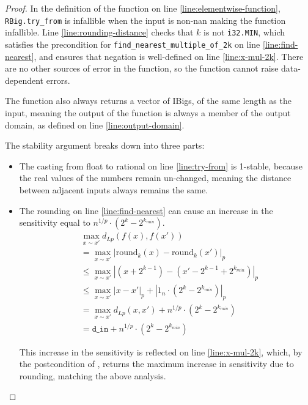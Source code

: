 \documentclass{article}
\begin{document}
\begin{proof}
    In the definition of the function on line \ref{line:elementwise-function},
    \texttt{RBig.try\_from} is infallible when the input is non-nan making the function infallible.
    Line \ref{line:rounding-distance} checks that $k$ is not \texttt{i32.MIN},
    which satisfies the precondition for \texttt{find\_nearest\_multiple\_of\_2k} on line \ref{line:find-nearest},
    and ensures that negation is well-defined on line \ref{line:x-mul-2k}.
    There are no other sources of error in the function, 
    so the function cannot raise data-dependent errors.

    The function also always returns a vector of IBigs, of the same length as the input, 
    meaning the output of the function is always a member of the output domain,
    as defined on line \ref{line:output-domain}.

    The stability argument breaks down into three parts:
    \begin{itemize}
        \item The casting from float to rational on line \ref{line:try-from} is 1-stable,
        because the real values of the numbers remain un-changed,
        meaning the distance between adjacent inputs always remains the same.
        \item The rounding on line \ref{line:find-nearest} can cause an increase in the sensitivity equal to $n^{1/p} \cdot (2^k - 2^{k_{min}})$.
        \begin{align}
            & \max_{x \sim x'} d_{Lp}(f(x), f(x'))\\
            & = \max_{x \sim x'} |\mathrm{round}_k(x) - \mathrm{round}_k(x')|_p\\
            & \leq \max_{x \sim x'} |(x + 2^{k - 1}) - (x' - 2^{k - 1} + 2^{k_{min}})|_p\\
            & \leq \max_{x \sim x'} |x - x'|_p + |1_n \cdot (2^{k} - 2^{k_{min}})|_p\\
            & = \max_{x \sim x'} d_{Lp}(x, x') + n^{1/p} \cdot (2^{k} - 2^{k_{min}})\\
            & = \texttt{d\_in} + n^{1/p} \cdot (2^{k} - 2^{k_{min}})
        \end{align}
    
        This increase in the sensitivity is reflected on line \ref{line:x-mul-2k},
        which, by the postcondition of ,
        returns the maximum increase in sensitivity due to rounding,
        matching the above analysis.


\end{itemize}
\end{proof}
\end{document}
